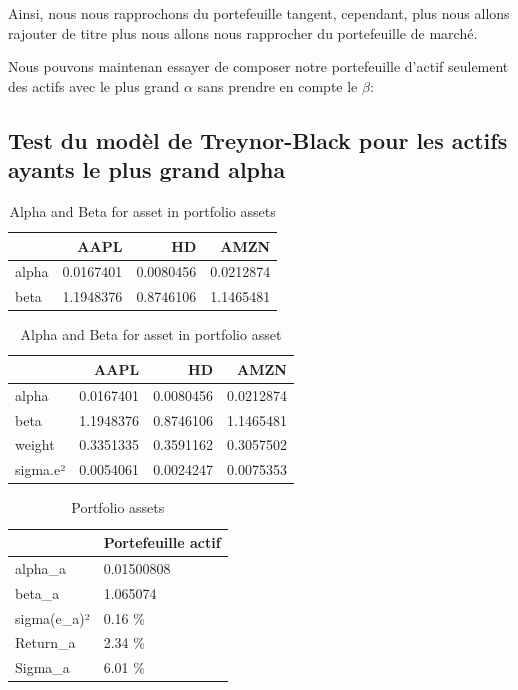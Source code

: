 \documentclass[
]{article}
\begin{document}
Ainsi, nous nous rapprochons du portefeuille tangent, cependant, plus
nous allons rajouter de titre plus nous allons nous rapprocher du
portefeuille de marché.

Nous pouvons maintenan essayer de composer notre portefeuille d'actif
seulement des actifs avec le plus grand \(\alpha\) sans prendre en
compte le \(\beta\):

\hypertarget{test-du-moduxe8l-de-treynor-black-pour-les-actifs-ayants-le-plus-grand-alpha}{%
\subsection{Test du modèl de Treynor-Black pour les actifs ayants le
plus grand
alpha}\label{test-du-moduxe8l-de-treynor-black-pour-les-actifs-ayants-le-plus-grand-alpha}}

\begin{table}[H]

\caption{\label{tab:unnamed-chunk-23}Alpha and Beta for asset in portfolio assets}
\centering
\begin{tabular}[t]{lrrr}
\toprule
  & AAPL & HD & AMZN\\
\midrule
alpha & 0.0167401 & 0.0080456 & 0.0212874\\
beta & 1.1948376 & 0.8746106 & 1.1465481\\
\bottomrule
\end{tabular}
\end{table}
\begin{table}[H]

\caption{\label{tab:unnamed-chunk-24}Alpha and Beta for asset in portfolio asset}
\centering
\begin{tabular}[t]{lrrr}
\toprule
  & AAPL & HD & AMZN\\
\midrule
alpha & 0.0167401 & 0.0080456 & 0.0212874\\
beta & 1.1948376 & 0.8746106 & 1.1465481\\
weight & 0.3351335 & 0.3591162 & 0.3057502\\
sigma.e² & 0.0054061 & 0.0024247 & 0.0075353\\
\bottomrule
\end{tabular}
\end{table}
\begin{table}[H]

\caption{\label{tab:unnamed-chunk-25}Portfolio assets}
\centering
\begin{tabular}[t]{ll}
\toprule
  & Portefeuille actif\\
\midrule
alpha\_a & 0.01500808\\
beta\_a & 1.065074\\
sigma(e\_a)² & 0.16 \%\\
Return\_a & 2.34 \%\\
Sigma\_a & 6.01 \%\\
\bottomrule
\end{tabular}
\end{table}
\end{document}
